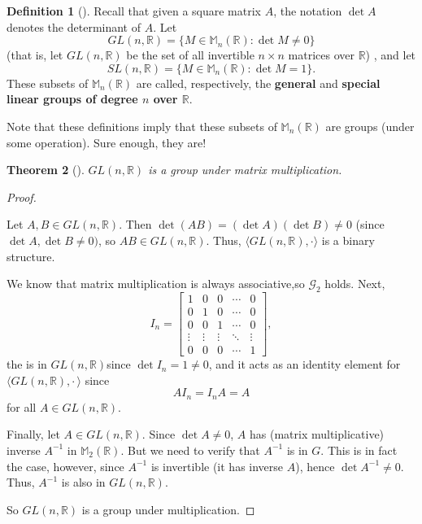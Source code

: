 \documentclass[10pt,openany,oneside]{book}
\newcommand{\terminology}[1]{\textbf{#1}}
\theoremstyle{plain}
\newtheorem{theorem}{Theorem}[section]
\theoremstyle{definition}
\newtheorem{definition}[theorem]{Definition}
\theoremstyle{definition}
\theoremstyle{definition}
\theoremstyle{definition}
\numberwithin{equation}{section}
\def\R{\mathbb{R}}
\def\M{\mathbb{M}}
\def\G{\mathcal{G}}
\newcommand{\amp}{&}
\begin{document}
\begin{definition}[{}]\label{definition-20}
\label{notation-32}
\label{notation-33}
Recall that given a square matrix \(A\), the notation \(\det A\) denotes the determinant of \(A\). Let%
\begin{equation*}
GL(n,\R)=\{M\in \M_n(\R):\det M \neq 0\}
\end{equation*}
(that is, let \(GL(n,\R)\) be  the set of all invertible \(n \times n\) matrices over \(\R\)) , and let%
\begin{equation*}
SL(n,\R)=\{M\in \M_n(\R):\det M =1\}\text{.}
\end{equation*}
These subsets of \(\M_n(\R)\) are called, respectively, the \terminology{general} and \terminology{special linear groups of degree \(n\) over \(\R\)}.%
\end{definition}
Note that these definitions imply that these subsets of \(\M_n(\R)\) are groups (under some operation). Sure enough, they are!%
\begin{theorem}[{}]\label{gl}
\label{notation-34}
 \(GL(n,\R)\) is a group under matrix multiplication.%
\end{theorem}
\begin{proof}\hypertarget{proof-7}{}
Let \(A,B\in GL(n, \R)\). Then \(\det(AB)=(\det A)(\det B) \neq 0\) (since \(\det A, \det B \neq 0)\), so \(AB\in GL(n,\R)\).  Thus, \(\langle GL(n,\R), \cdot\rangle\) is a binary structure.%
\par
We know that matrix multiplication is always associative,so \(\G_2\) holds. Next,%
\begin{equation*}
I_n= \begin{bmatrix}1 \amp  0 \amp  0 \amp  \cdots \amp  0 \\
0 \amp  1 \amp  0 \amp  \cdots \amp  0 \\
0 \amp  0 \amp  1 \amp  \cdots \amp  0 \\
\vdots \amp  \vdots \amp  \vdots \amp  \ddots \amp  \vdots \\
0 \amp  0 \amp  0 \amp  \cdots \amp  1
\end{bmatrix},
\end{equation*}
the  is in \(GL(n,\R)\)since \(\det I_n=1\neq 0\), and it acts as an identity element for \(\langle GL(n,\R), \cdot\,\rangle\) since%
\begin{equation*}
AI_n=I_nA = A
\end{equation*}
for all \(A\in GL(n,\R)\).%
\par
Finally, let \(A\in GL(n,\R)\).  Since \(\det A\neq 0\), \(A\) has (matrix multiplicative) inverse \(A^{-1}\) in \(\M_2(\R)\). But we need to verify that \(A^{-1}\) is in \(G\). This is in fact the case, however, since \(A^{-1}\) is invertible (it has inverse \(A\)), hence \(\det
A^{-1} \neq 0\).  Thus, \(A^{-1}\) is also in \(GL(n,\R)\).%
\par
So \(GL(n,\R)\) is a group under multiplication.%
\end{proof}
\end{document}
